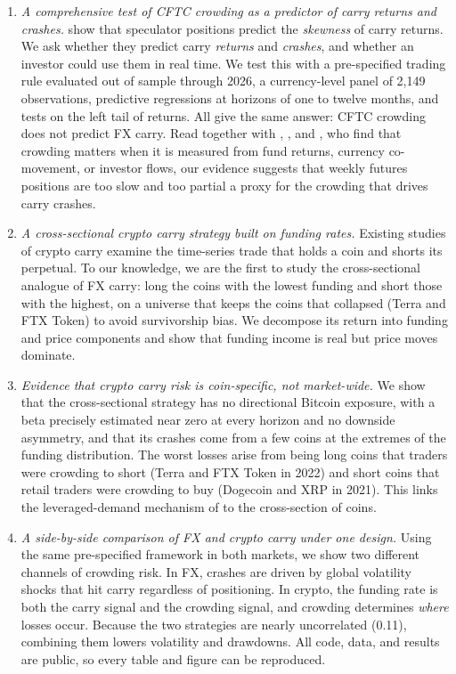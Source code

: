 \documentclass[11pt]{article}
\begin{document}
\begin{enumerate}
\item \emph{A comprehensive test of CFTC crowding as a predictor of carry returns and crashes.} \citet{BrunnermeierNagelPedersen2008} show that speculator positions predict the \emph{skewness} of carry returns. We ask whether they predict carry \emph{returns} and \emph{crashes}, and whether an investor could use them in real time. We test this with a pre-specified trading rule evaluated out of sample through 2026, a currency-level panel of 2,149 observations, predictive regressions at horizons of one to twelve months, and tests on the left tail of returns. All give the same answer: CFTC crowding does not predict FX carry. Read together with \citet{PojarlievLevich2011}, \citet{Sokolovski2016}, and \citet{CheemaFox2025}, who find that crowding matters when it is measured from fund returns, currency co-movement, or investor flows, our evidence suggests that weekly futures positions are too slow and too partial a proxy for the crowding that drives carry crashes.

\item \emph{A cross-sectional crypto carry strategy built on funding rates.} Existing studies of crypto carry \citep{Christin2023, Schmeling2025, Borri2025} examine the time-series trade that holds a coin and shorts its perpetual. To our knowledge, we are the first to study the cross-sectional analogue of FX carry: long the coins with the lowest funding and short those with the highest, on a universe that keeps the coins that collapsed (Terra and FTX Token) to avoid survivorship bias. We decompose its return into funding and price components and show that funding income is real but price moves dominate.

\item \emph{Evidence that crypto carry risk is coin-specific, not market-wide.} We show that the cross-sectional strategy has no directional Bitcoin exposure, with a beta precisely estimated near zero at every horizon and no downside asymmetry, and that its crashes come from a few coins at the extremes of the funding distribution. The worst losses arise from being long coins that traders were crowding to short (Terra and FTX Token in 2022) and short coins that retail traders were crowding to buy (Dogecoin and XRP in 2021). This links the leveraged-demand mechanism of \citet{Schmeling2025} to the cross-section of coins.

\item \emph{A side-by-side comparison of FX and crypto carry under one design.} Using the same pre-specified framework in both markets, we show two different channels of crowding risk. In FX, crashes are driven by global volatility shocks that hit carry regardless of positioning. In crypto, the funding rate is both the carry signal and the crowding signal, and crowding determines \emph{where} losses occur. Because the two strategies are nearly uncorrelated (0.11), combining them lowers volatility and drawdowns. All code, data, and results are public, so every table and figure can be reproduced.
\end{enumerate}
\end{document}
